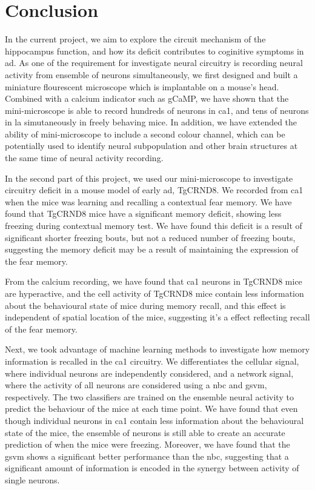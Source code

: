 \section{Conclusion}

In the current project, we aim to explore the circuit mechanism of the hippocampus function, and how its deficit contributes to coginitive symptoms in \gls{ad}. As one of the requirement for investigate neural circuitry is recording neural activity from ensemble of neurons simultaneously, we first designed and built a miniature flourescent microscope which is implantable on a mouse's head. Combined with a calcium indicator such as gCaMP, we have shown that the mini-microscope is able to record hundreds of neurons in \gls{ca1}, and tens of neurons in \gls{la} simutaneously in freely behaving mice. In addition, we have extended the ability of mini-microscope to include a second colour channel, which can be potentially used to identify neural subpopulation and other brain structures at the same time of neural activity recording.

In the second part of this project, we used our mini-microscope to investigate circuitry deficit in a mouse model of early \gls{ad}, TgCRND8. We recorded from \gls{ca1} when the mice was learning and recalling a contextual fear memory. We have found that TgCRND8 mice have a significant memory deficit, showing less freezing during contextual memory test. We have found this deficit is a result of significant shorter freezing bouts, but not a reduced number of freezing bouts, suggesting the memory deficit may be a result of maintaining the expression of the fear memory.

From the calcium recording, we have found that \gls{ca1} neurons in TgCRND8 mice are hyperactive, and the cell activity of TgCRND8 mice contain less information about the behavioural state of mice during memory recall, and this effect is independent of spatial location of the mice, suggesting it's a effect reflecting recall of the fear memory. 

Next, we took advantage of machine learning methods to investigate how memory information is recalled in the \gls{ca1} circuitry. We differentiates the cellular signal, where individual neurons are independently considered, and a network signal, where the activity of all neurons are considered using a \gls{nbc} and \gls{gsvm}, respectively. The two classifiers are trained on the ensemble neural activity to predict the behaviour of the mice at each time point. We have found that even though individual neurons in \gls{ca1} contain less information about the behavioural state of the mice, the ensemble of neurons is still able to create an accurate prediction of when the mice were freezing. Moreover, we have found that the \gls{gsvm} shows a significant better performance than the \gls{nbc}, suggesting that a significant amount of information is encoded in the synergy between activity of single neurons.

